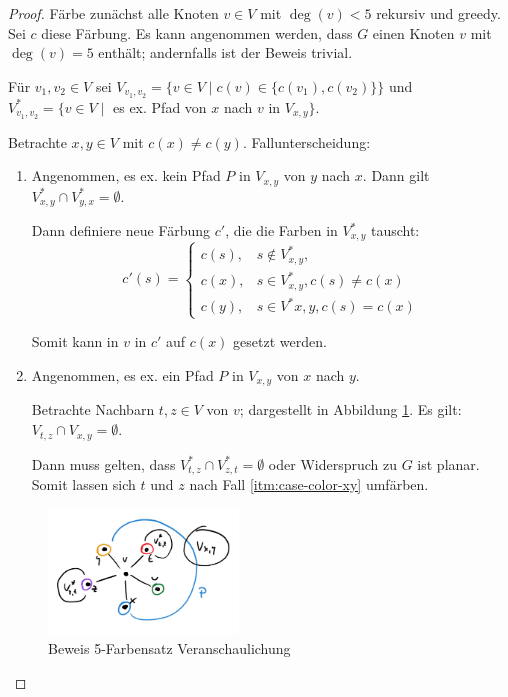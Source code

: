 \begin{proof}
    Färbe zunächst alle Knoten $ v \in V $ mit $ \deg(v) < 5 $ rekursiv und greedy.
    Sei $ c $ diese Färbung.
    Es kann angenommen werden, dass $ G $ einen Knoten $ v $ mit $ \deg(v) = 5 $ enthält; andernfalls ist der Beweis trivial.

    Für $ v_1, v_2 \in V $ sei $ V_{v_1, v_2} = \{ v \in V \mid c(v) \in \{ c(v_1), c(v_2) \} \} $ und $ V^*_{v_1, v_2} = \{ v \in V \mid $ es ex. Pfad von $ x $ nach $ v $ in $ V_{x, y} \} $.

    Betrachte $ x, y \in V $ mit $ c(x) \ne c(y) $.
    Fallunterscheidung:
    \begin{enumerate}
        \item \label{itm:case-color-xy}
        Angenommen, es ex. kein Pfad $ P $ in $ V_{x,y} $ von $ y $ nach $ x $.
        Dann gilt $ V^*_{x,y} \cap V^*_{y,x} = \emptyset $.

        Dann definiere neue Färbung $ c' $, die die Farben in $ V^*_{x, y} $ tauscht:
        \begin{equation*}
            c'(s) = \begin{cases}
                c(s), & s \notin V^*_{x, y}, \\
                c(x), & s \in V^*_{x,y}, c(s) \ne c(x) \\
                c(y), & s \in V^*{x,y}, c(s) = c(x)
            \end{cases}
        \end{equation*}

        Somit kann in $ v $ in $ c' $ auf $ c(x) $ gesetzt werden.

        \item Angenommen, es ex. ein Pfad $ P $ in $ V_{x,y} $ von $ x $ nach $ y $.

        Betrachte Nachbarn $ t, z \in V $ von $ v $; dargestellt in Abbildung \ref{fig:5-colorable}.
        Es gilt: $ V_{t,z} \cap V_{x,y} = \emptyset $.

        Dann muss gelten, dass $ V^*_{t,z} \cap V^*_{z,t} = \emptyset $ oder Widerspruch zu $ G $ ist planar.
        Somit lassen sich $ t $ und $ z $ nach Fall \ref{itm:case-color-xy} umfärben.
    \end{enumerate}

    \begin{figure}
        \centering
        \includegraphics[width=0.45\textwidth]{figures/5-colorable.png}
        \caption{Beweis 5-Farbensatz Veranschaulichung}
        \label{fig:5-colorable}
    \end{figure}
\end{proof}
